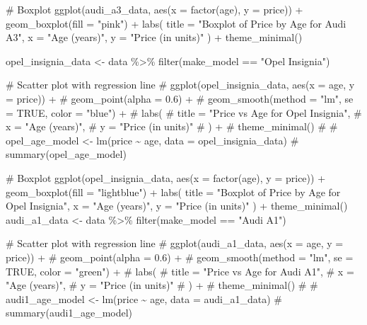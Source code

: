 \documentclass[
  letterpaper,
  DIV=11,
  numbers=noendperiod]{scrartcl}
\newenvironment{Shaded}{\begin{snugshade}}{\end{snugshade}}
\newcommand{\AttributeTok}[1]{\textcolor[rgb]{0.40,0.45,0.13}{#1}}
\newcommand{\CommentTok}[1]{\textcolor[rgb]{0.37,0.37,0.37}{#1}}
\newcommand{\FunctionTok}[1]{\textcolor[rgb]{0.28,0.35,0.67}{#1}}
\newcommand{\NormalTok}[1]{\textcolor[rgb]{0.00,0.23,0.31}{#1}}
\newcommand{\OtherTok}[1]{\textcolor[rgb]{0.00,0.23,0.31}{#1}}
\newcommand{\SpecialCharTok}[1]{\textcolor[rgb]{0.37,0.37,0.37}{#1}}
\newcommand{\StringTok}[1]{\textcolor[rgb]{0.13,0.47,0.30}{#1}}
\begin{document}
\begin{Shaded}
\begin{Highlighting}[]
\CommentTok{\# Boxplot}
\FunctionTok{ggplot}\NormalTok{(audi\_a3\_data, }\FunctionTok{aes}\NormalTok{(}\AttributeTok{x =} \FunctionTok{factor}\NormalTok{(age), }\AttributeTok{y =}\NormalTok{ price)) }\SpecialCharTok{+}
  \FunctionTok{geom\_boxplot}\NormalTok{(}\AttributeTok{fill =} \StringTok{"pink"}\NormalTok{) }\SpecialCharTok{+}
  \FunctionTok{labs}\NormalTok{(}
    \AttributeTok{title =} \StringTok{"Boxplot of Price by Age for Audi A3"}\NormalTok{,}
    \AttributeTok{x =} \StringTok{"Age (years)"}\NormalTok{,}
    \AttributeTok{y =} \StringTok{"Price (in units)"}
\NormalTok{  ) }\SpecialCharTok{+}
  \FunctionTok{theme\_minimal}\NormalTok{()}

\NormalTok{opel\_insignia\_data }\OtherTok{\textless{}{-}}\NormalTok{ data }\SpecialCharTok{\%\textgreater{}\%} \FunctionTok{filter}\NormalTok{(make\_model }\SpecialCharTok{==} \StringTok{"Opel Insignia"}\NormalTok{)}

\CommentTok{\# Scatter plot with regression line}
\CommentTok{\# ggplot(opel\_insignia\_data, aes(x = age, y = price)) +}
\CommentTok{\#   geom\_point(alpha = 0.6) +}
\CommentTok{\#   geom\_smooth(method = "lm", se = TRUE, color = "blue") +}
\CommentTok{\#   labs(}
\CommentTok{\#     title = "Price vs Age for Opel Insignia",}
\CommentTok{\#     x = "Age (years)",}
\CommentTok{\#     y = "Price (in units)"}
\CommentTok{\#   ) +}
\CommentTok{\#   theme\_minimal()}
\CommentTok{\# }
\CommentTok{\# opel\_age\_model \textless{}{-} lm(price \textasciitilde{} age, data = opel\_insignia\_data)}
\CommentTok{\# summary(opel\_age\_model)}

\CommentTok{\# Boxplot}
\FunctionTok{ggplot}\NormalTok{(opel\_insignia\_data, }\FunctionTok{aes}\NormalTok{(}\AttributeTok{x =} \FunctionTok{factor}\NormalTok{(age), }\AttributeTok{y =}\NormalTok{ price)) }\SpecialCharTok{+}
  \FunctionTok{geom\_boxplot}\NormalTok{(}\AttributeTok{fill =} \StringTok{"lightblue"}\NormalTok{) }\SpecialCharTok{+}
  \FunctionTok{labs}\NormalTok{(}
    \AttributeTok{title =} \StringTok{"Boxplot of Price by Age for Opel Insignia"}\NormalTok{,}
    \AttributeTok{x =} \StringTok{"Age (years)"}\NormalTok{,}
    \AttributeTok{y =} \StringTok{"Price (in units)"}
\NormalTok{  ) }\SpecialCharTok{+}
  \FunctionTok{theme\_minimal}\NormalTok{()}
\NormalTok{audi\_a1\_data }\OtherTok{\textless{}{-}}\NormalTok{ data }\SpecialCharTok{\%\textgreater{}\%} \FunctionTok{filter}\NormalTok{(make\_model }\SpecialCharTok{==} \StringTok{"Audi A1"}\NormalTok{)}

\CommentTok{\# Scatter plot with regression line}
\CommentTok{\# ggplot(audi\_a1\_data, aes(x = age, y = price)) +}
\CommentTok{\#   geom\_point(alpha = 0.6) +}
\CommentTok{\#   geom\_smooth(method = "lm", se = TRUE, color = "green") +}
\CommentTok{\#   labs(}
\CommentTok{\#     title = "Price vs Age for Audi A1",}
\CommentTok{\#     x = "Age (years)",}
\CommentTok{\#     y = "Price (in units)"}
\CommentTok{\#   ) +}
\CommentTok{\#   theme\_minimal()}
\CommentTok{\# }
\CommentTok{\# audi1\_age\_model \textless{}{-} lm(price \textasciitilde{} age, data = audi\_a1\_data)}
\CommentTok{\# summary(audi1\_age\_model)}


\end{Highlighting}
\end{Shaded}
\end{document}
